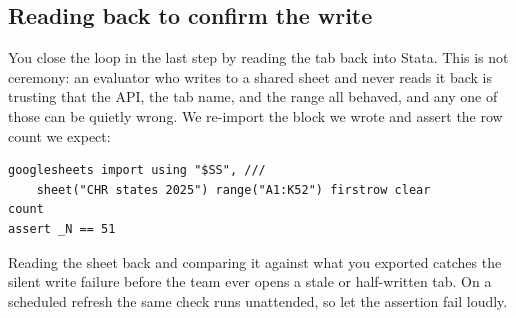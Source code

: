 \documentclass[
    a4paper,
    fontsize=10pt,
    twoside=true,
    numbers=noenddot,
]{kaobook}
\begin{document}
\subsection{Reading back to confirm the write}
You close the loop in the last step by reading the tab back into Stata. This is not ceremony: an evaluator who writes to a shared sheet and never reads it back is trusting that the API, the tab name, and the range all behaved, and any one of those can be quietly wrong. We re-import the block we wrote and assert the row count we expect:
\par
{\footnotesize
\begin{verbatim}
googlesheets import using "$SS", ///
    sheet("CHR states 2025") range("A1:K52") firstrow clear
count
assert _N == 51
\end{verbatim}
}
Reading the sheet back and comparing it against what you exported catches the silent write failure before the team ever opens a stale or half-written tab. On a scheduled refresh the same check runs unattended, so let the assertion fail loudly.
\end{document}

